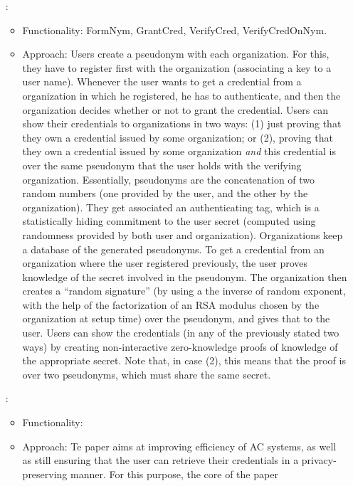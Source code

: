 \begin{enumerate}
\item[\cite{cl01}:]
  \begin{itemize}
  \item Functionality: FormNym, GrantCred, VerifyCred, VerifyCredOnNym.
  \item Approach: Users create a pseudonym with each organization. For this,
    they have to register first with the organization (associating a key to
    a user name). Whenever the user wants to get a credential from a organization
    in which he registered, he has to authenticate, and then the organization
    decides whether or not to grant the credential. Users can show their
    credentials to organizations in two ways: (1) just proving that they own a
    credential issued by some organization; or (2), proving that they own a
    credential issued by some organization \emph{and} this credential is over
    the same pseudonym that the user holds with the verifying organization.
    Essentially, pseudonyms are the concatenation of two random numbers (one
    provided by the user, and the other by the organization). They get
    associated an authenticating tag, which is a statistically hiding commitment
    to the user secret (computed using randomness provided by both user and
    organization). Organizations keep a database of the generated pseudonyms.
    To get a credential from an organization where the user registered
    previously, the user proves knowledge of the secret involved in the
    pseudonym. The organization then creates a ``random signature'' (by using a
    the inverse of random exponent, with the help of the factorization of an RSA
    modulus chosen by the organization at setup time) over the pseudonym, and
    gives that to the user. Users can show the credentials (in any of the
    previously stated two ways) by creating non-interactive zero-knowledge
    proofs of knowledge of the appropriate secret. Note that, in case (2),
    this means that the proof is over two pseudonyms, which must share the
    same secret.    
  \end{itemize}
\item[\cite{cl02}:]
  \begin{itemize}
  \item Functionality:
  \item Approach: Te paper aims at improving efficiency of AC systems, as
    well as still ensuring that the user can retrieve their credentials in
    a privacy-preserving manner. For this purpose, the core of the paper

\end{itemize}
\end{enumerate}

